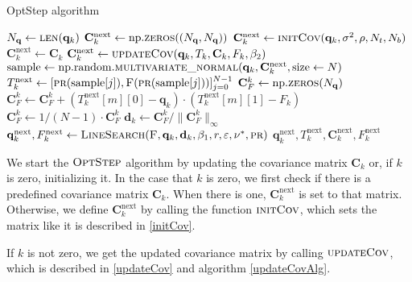 \begin{algorithm}[H]%
\caption{\label{OptStep}OptStep algorithm}
\begin{algorithmic}[1]
\State $N_\mathbf{q}\gets\Call{len}{\mathbf{q}_k}$
\State $\mathbf{C}^\mathrm{next}_k \gets \mathrm{np.}\Call{zeros}{(N_\mathbf{q}, N_\mathbf{q})}$
\State $\mathbf{C}^\mathrm{next}_k \gets \Call{initCov}{\mathbf{q}_k, \sigma^2, \rho, N_t, N_b}$
\Else
\State $\mathbf{C}^\mathrm{next}_k \gets \mathbf{C}_k$
\EndIf
\Else
\State $\mathbf{C}^\mathrm{next}_k \gets \Call{updateCov}{\mathbf{q}_k, T_k, \mathbf{C}_k, F_k ,\beta_2}$
\EndIf
\State $\mathrm{sample} \gets \mathrm{np.random.}\Call{multivariate\_normal}{\mathbf{q}_k, \mathbf{C}^\mathrm{next}_k, \mathrm{size} \gets N}$
\State $T^\mathrm{next}_k\gets[\Call{pr}{\mathrm{sample}[j]},\Call{F}{\protect\Call{pr}{\mathrm{sample}[j]}}]_{j=0}^{N-1}$
\State $\mathbf{C}^k_F \gets \mathrm{np.}\Call{zeros}{N_\mathbf{q}}$
\State $\mathbf{C}^k_F \gets \mathbf{C}^k_F+(T^\mathrm{next}_k[m][0]-\mathbf{q}_k)\cdot(T^\mathrm{next}_k[m][1]-F_k)$
\EndFor
\State $\mathbf{C}^k_F \gets 1/(N-1)\cdot\mathbf{C}^k_F$
\State $\mathbf{d}_k \gets \mathbf{C}^k_F/\|\mathbf{C}^k_F\|_\infty$
\State $\mathbf{q}^\mathrm{next}_{k}, F^\mathrm{next}_k \gets \Call{LineSearch}{\textproc{F},\mathbf{q}_k,\mathbf{d}_k,\beta_1,r,\varepsilon,\nu^*,\textproc{pr}}$
\State \Return $\mathbf{q}^\mathrm{next}_k,T^\mathrm{next}_k,\mathbf{C}^\mathrm{next}_k,F^\mathrm{next}_k$
\EndFunction
\end{algorithmic}
\end{algorithm}

We start the $\textproc{OptStep}$ algorithm by updating the covariance matrix $\mathbf{C}_k$ or, if $k$ is zero, initializing it. In the case that $k$ is zero, we first check if there is a predefined covariance matrix $\mathbf{C}_k$. When there is one, $\mathbf{C}^\mathrm{next}_k$ is set to that matrix. Otherwise, we define $\mathbf{C}^\mathrm{next}_k$ by calling the function $\textproc{initCov}$, which sets the matrix like it is described in \eqref{initCov}.

If $k$ is not zero, we get the updated covariance matrix by calling $\textproc{updateCov}$, which is described in \eqref{updateCov} and algorithm \ref{updateCovAlg}.

